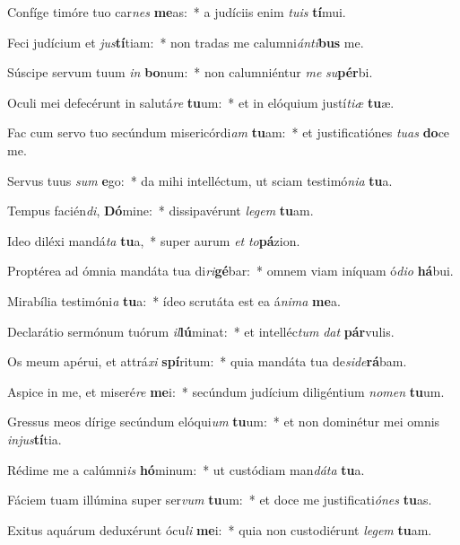 \item Confíge timóre tuo car\textit{nes} \textbf{me}as:~* a judíciis enim \textit{tu}\textit{is} \textbf{tí}mui.
\item Feci judícium et \textit{jus}\textbf{tí}tiam:~* non tradas me calumni\textit{án}\textit{ti}\textbf{bus} me.
\item Súscipe servum tuum \textit{in} \textbf{bo}num:~* non calumniéntur \textit{me} \textit{su}\textbf{pér}bi.
\item Oculi mei defecérunt in salutá\textit{re} \textbf{tu}um:~* et in elóquium justí\textit{ti}\textit{æ} \textbf{tu}æ.
\item Fac cum servo tuo secúndum misericórdi\textit{am} \textbf{tu}am:~* et justificatiónes \textit{tu}\textit{as} \textbf{do}ce me.
\item Servus tuus \textit{sum} \textbf{e}go:~* da mihi intelléctum, ut sciam testimó\textit{ni}\textit{a} \textbf{tu}a.
\item Tempus facién\textit{di}, \textbf{Dó}mine:~* dissipavérunt \textit{le}\textit{gem} \textbf{tu}am.
\item Ideo diléxi mandá\textit{ta} \textbf{tu}a,~* super aurum \textit{et} \textit{to}\textbf{pá}zion.
\item Proptérea ad ómnia mandáta tua di\textit{ri}\textbf{gé}bar:~* omnem viam iníquam ó\textit{di}\textit{o} \textbf{há}bui.
\item Mirabília testimóni\textit{a} \textbf{tu}a:~* ídeo scrutáta est ea á\textit{ni}\textit{ma} \textbf{me}a.
\item Declarátio sermónum tuórum \textit{il}\textbf{lú}minat:~* et intelléc\textit{tum} \textit{dat} \textbf{pár}vulis.
\item Os meum apérui, et attrá\textit{xi} \textbf{spí}ritum:~* quia mandáta tua de\textit{si}\textit{de}\textbf{rá}bam.
\item Aspice in me, et miseré\textit{re} \textbf{me}i:~* secúndum judícium diligéntium \textit{no}\textit{men} \textbf{tu}um.
\item Gressus meos dírige secúndum elóqui\textit{um} \textbf{tu}um:~* et non dominétur mei omnis \textit{in}\textit{jus}\textbf{tí}tia.
\item Rédime me a calúmni\textit{is} \textbf{hó}minum:~* ut custódiam man\textit{dá}\textit{ta} \textbf{tu}a.
\item Fáciem tuam illúmina super ser\textit{vum} \textbf{tu}um:~* et doce me justificati\textit{ó}\textit{nes} \textbf{tu}as.
\item Exitus aquárum deduxérunt ócu\textit{li} \textbf{me}i:~* quia non custodiérunt \textit{le}\textit{gem} \textbf{tu}am.
